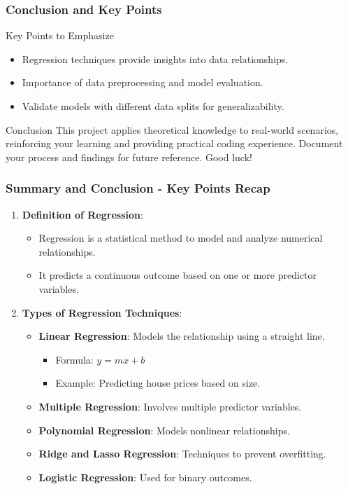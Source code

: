 \documentclass[aspectratio=169]{beamer}
\begin{document}
\begin{frame}
    \frametitle{Conclusion and Key Points}
    \begin{block}{Key Points to Emphasize}
        \begin{itemize}
            \item Regression techniques provide insights into data relationships.
            \item Importance of data preprocessing and model evaluation.
            \item Validate models with different data splits for generalizability.
        \end{itemize}
    \end{block}

    \begin{block}{Conclusion}
        This project applies theoretical knowledge to real-world scenarios, reinforcing your learning and providing practical coding experience. Document your process and findings for future reference. Good luck!
    \end{block}
\end{frame}

\begin{frame}[fragile]
    \frametitle{Summary and Conclusion - Key Points Recap}
    \begin{enumerate}
        \item \textbf{Definition of Regression}:
        \begin{itemize}
            \item Regression is a statistical method to model and analyze numerical relationships.
            \item It predicts a continuous outcome based on one or more predictor variables.
        \end{itemize}

        \item \textbf{Types of Regression Techniques}:
        \begin{itemize}
            \item \textbf{Linear Regression}: Models the relationship using a straight line.
            \begin{itemize}
                \item Formula: \( y = mx + b \)
                \item Example: Predicting house prices based on size.
            \end{itemize}
            \item \textbf{Multiple Regression}: Involves multiple predictor variables.
            \item \textbf{Polynomial Regression}: Models nonlinear relationships.
            \item \textbf{Ridge and Lasso Regression}: Techniques to prevent overfitting.
            \item \textbf{Logistic Regression}: Used for binary outcomes.
        \end{itemize}
    \end{enumerate}
\end{frame}
\end{document}
